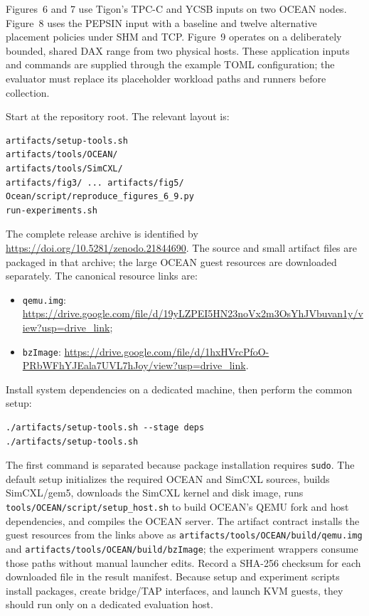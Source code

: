 \documentclass[conference]{IEEEtran}
\begin{document}
Figures~6 and 7 use Tigon's TPC-C and YCSB inputs on two OCEAN nodes.
Figure~8 uses the PEPSIN input with a baseline and twelve alternative
placement policies under SHM and TCP.  Figure~9 operates on a deliberately
bounded, shared DAX range from two physical hosts.  These application inputs
and commands are supplied through the example TOML configuration; the
evaluator must replace its placeholder workload paths and runners before
collection.


Start at the repository root.  The relevant layout is:
\begin{verbatim}
artifacts/setup-tools.sh
artifacts/tools/OCEAN/
artifacts/tools/SimCXL/
artifacts/fig3/ ... artifacts/fig5/
Ocean/script/reproduce_figures_6_9.py
run-experiments.sh
\end{verbatim}
The complete release archive is identified by
\url{https://doi.org/10.5281/zenodo.21844690}.  The source and small artifact
files are packaged in that archive; the large OCEAN guest resources are
downloaded separately.  The canonical resource links are:
\begin{itemize}
  \item \texttt{qemu.img}:
  \url{https://drive.google.com/file/d/19yLZPEI5HN23noVx2m3OsYhJVbuvan1y/view?usp=drive_link};
  \item \texttt{bzImage}:
  \url{https://drive.google.com/file/d/1hxHVrcPfoO-PRbWFhYJEala7UVL7hJoy/view?usp=drive_link}.
\end{itemize}
Install system dependencies on a dedicated machine, then perform the common
setup:
\begin{verbatim}
./artifacts/setup-tools.sh --stage deps
./artifacts/setup-tools.sh
\end{verbatim}
The first command is separated because package installation requires
\texttt{sudo}.  The default setup initializes the required OCEAN and SimCXL
sources, builds SimCXL/gem5, downloads the SimCXL kernel and disk image, runs
\texttt{tools/OCEAN/script/setup\_host.sh} to build OCEAN's QEMU fork and host
dependencies, and compiles the OCEAN server.  The artifact contract installs
the guest resources from the links above as
\texttt{artifacts/tools/OCEAN/build/qemu.img} and
\texttt{artifacts/tools/OCEAN/build/bzImage}; the experiment wrappers consume
those paths without manual launcher edits.  Record a SHA-256 checksum for
each downloaded file in the result manifest.  Because setup and experiment
scripts install packages, create bridge/TAP interfaces, and launch KVM guests,
they should run only on a dedicated evaluation host.
\end{document}
